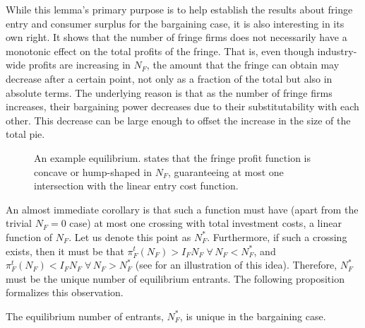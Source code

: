 While this lemma's primary purpose is to help establish the results about fringe entry and consumer surplus for the bargaining case, it is also interesting in its own right.
It shows that the number of fringe firms does not necessarily have a monotonic effect on the total profits of the fringe.
That is, even though industry-wide profits are increasing in $N_F$, the amount that the fringe can obtain may decrease after a certain point, not only as a fraction of the total but also in absolute terms.
The underlying reason is that as the number of fringe firms increases, their bargaining power decreases due to their substitutability with each other.
This decrease can be large enough to offset the increase in the size of the total pie.

\begin{figure}[ht]
    \centering
    \caption{An example equilibrium.  states that the fringe profit function is concave or hump-shaped in $N_F$, guaranteeing at most one intersection with the linear entry cost function.}
    \label{fig:equilibrium}
\end{figure}

An almost immediate corollary is that such a function must have (apart from the trivial $N_F=0$ case) at most one crossing with total investment costs, a linear function of $N_F$.
Let us denote this point as $N_F^*$.
Furthermore, if such a crossing exists, then it must be that $\pi_F^t(N_F) > I_F N_F \;\forall\, N_F < N_F^*$, and $\pi_F^t(N_F) < I_F N_F \;\forall\, N_F > N_F^*$ (see  for an illustration of this idea).
Therefore, $N_F^*$ must be the unique number of equilibrium entrants.
The following proposition formalizes this observation.
\begin{proposition}
    \label{prop:unique_equilibrium}
    The equilibrium number of entrants, $N_F^*$, is unique in the bargaining case.
\end{proposition}

